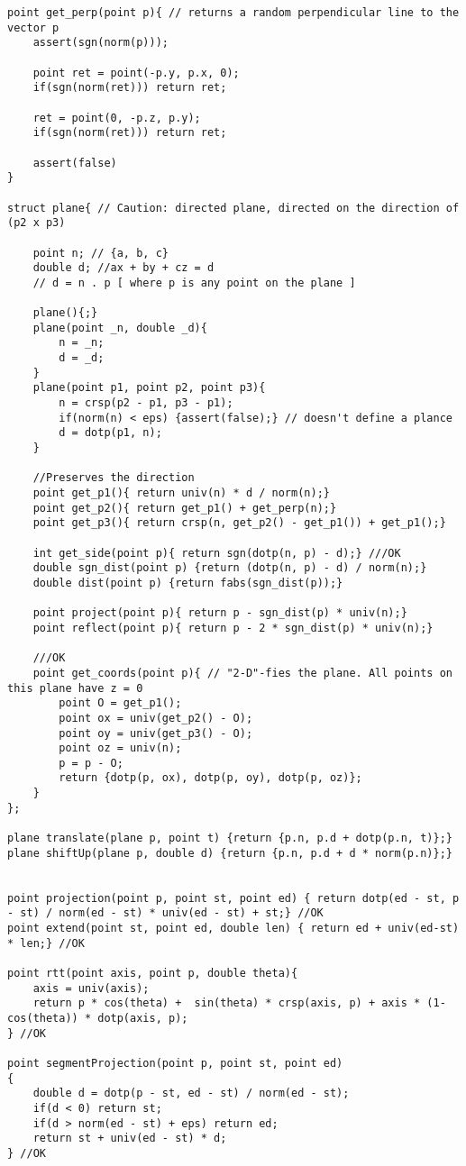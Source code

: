 \documentclass[10pt,a4paper,onesided]{article}
\begin{document}
\begin{multicols*}{3}
\begin{lstlisting}
point get_perp(point p){ // returns a random perpendicular line to the vector p
    assert(sgn(norm(p)));

    point ret = point(-p.y, p.x, 0);
    if(sgn(norm(ret))) return ret;

    ret = point(0, -p.z, p.y);
    if(sgn(norm(ret))) return ret;

    assert(false)
}

struct plane{ // Caution: directed plane, directed on the direction of (p2 x p3)

	point n; // {a, b, c}
	double d; //ax + by + cz = d
	// d = n . p [ where p is any point on the plane ]

	plane(){;}
	plane(point _n, double _d){
        n = _n;
        d = _d;
	}
	plane(point p1, point p2, point p3){
		n = crsp(p2 - p1, p3 - p1);
		if(norm(n) < eps) {assert(false);} // doesn't define a plance
		d = dotp(p1, n);
	}

    //Preserves the direction
	point get_p1(){ return univ(n) * d / norm(n);}
	point get_p2(){ return get_p1() + get_perp(n);}
	point get_p3(){ return crsp(n, get_p2() - get_p1()) + get_p1();}

	int get_side(point p){ return sgn(dotp(n, p) - d);} ///OK
	double sgn_dist(point p) {return (dotp(n, p) - d) / norm(n);}
	double dist(point p) {return fabs(sgn_dist(p));}

	point project(point p){ return p - sgn_dist(p) * univ(n);}
	point reflect(point p){ return p - 2 * sgn_dist(p) * univ(n);}

    ///OK
    point get_coords(point p){ // "2-D"-fies the plane. All points on this plane have z = 0
        point O = get_p1();
        point ox = univ(get_p2() - O);
        point oy = univ(get_p3() - O);
        point oz = univ(n);
        p = p - O;
        return {dotp(p, ox), dotp(p, oy), dotp(p, oz)};
    }
};

plane translate(plane p, point t) {return {p.n, p.d + dotp(p.n, t)};}
plane shiftUp(plane p, double d) {return {p.n, p.d + d * norm(p.n)};}


point projection(point p, point st, point ed) { return dotp(ed - st, p - st) / norm(ed - st) * univ(ed - st) + st;} //OK
point extend(point st, point ed, double len) { return ed + univ(ed-st) * len;} //OK

point rtt(point axis, point p, double theta){
    axis = univ(axis);
    return p * cos(theta) +  sin(theta) * crsp(axis, p) + axis * (1-cos(theta)) * dotp(axis, p);
} //OK

point segmentProjection(point p, point st, point ed)
{
    double d = dotp(p - st, ed - st) / norm(ed - st);
    if(d < 0) return st;
    if(d > norm(ed - st) + eps) return ed;
    return st + univ(ed - st) * d;
} //OK


\end{lstlisting}
\end{multicols*}
\end{document}
